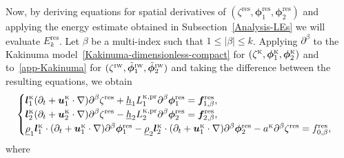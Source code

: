 \documentclass[11pt,leqno]{article}
\numberwithin{equation}{section}
\numberwithin{figure}{section}
\begin{document}
Now, by deriving equations for spatial derivatives of $(\zeta^\mathrm{res},\bm{\phi}_1^\mathrm{res},\bm{\phi}_2^\mathrm{res})$ 
and applying the energy estimate obtained in Subsection~\ref{Analysis-LEs} we will evaluate $E_{k}^\mathrm{res}$. 
Let $\beta$ be a multi-index such that $1\leq|\beta|\leq k$. 
Applying $\partial^\beta$ to the Kakinuma model~\eqref{Kakinuma-dimensionless-compact} for 
$(\zeta^{\mbox{\rm\tiny K}},\bm{\phi}_1^{\mbox{\rm\tiny K}},\bm{\phi}_2^{\mbox{\rm\tiny K}})$ 
and to~\eqref{app-Kakinuma} for 
$(\zeta^{\mbox{\rm\tiny IW}},\tilde{\bm{\phi}}_1^{\mbox{\rm\tiny IW}},\tilde{\bm{\phi}}_2^{\mbox{\rm\tiny IW}})$ 
and taking the difference between the resulting equations, we obtain 
%
\[
\begin{cases}
 \displaystyle
 {\bm l}_1^{\mbox{\rm\tiny K}}(\partial_t+\bm{u}_1^{\mbox{\rm\tiny K}}\cdot\nabla)\partial^\beta\zeta^\mathrm{res}
  + \underline{h}_1 L_1^{\mbox{\rm\tiny K},\mathrm{pr}}\partial^\beta\bm{\phi}_1^\mathrm{res} = \bm{f}_{1,\beta}^\mathrm{res}, \\
 \displaystyle
 {\bm l}_2^{\mbox{\rm\tiny K}}(\partial_t+\bm{u}_2^{\mbox{\rm\tiny K}}\cdot\nabla)\partial^\beta\zeta^\mathrm{res}
  - \underline{h}_2 L_2^{\mbox{\rm\tiny K},\mathrm{pr}}\partial^\beta\bm{\phi}_2^\mathrm{res} = \bm{f}_{2,\beta}^\mathrm{res}, \\
 \underline{\rho}_1{\bm l}_1^{\mbox{\rm\tiny K}}\cdot
  ( \partial_t+\bm{u}_1^{\mbox{\rm\tiny K}}\cdot\nabla )\partial^\beta\bm{\phi}_1^\mathrm{res} 
  - \underline{\rho}_2{\bm l}_2^{\mbox{\rm\tiny K}}\cdot
  ( \partial_t+\bm{u}_1^{\mbox{\rm\tiny K}}\cdot\nabla )\partial^\beta\bm{\phi}_2^\mathrm{res} 
  - a^{\mbox{\rm\tiny K}}\partial^\beta\zeta^\mathrm{res} = f_{0,\beta}^\mathrm{res},
\end{cases}
\]
%
where 
%
\end{document}
